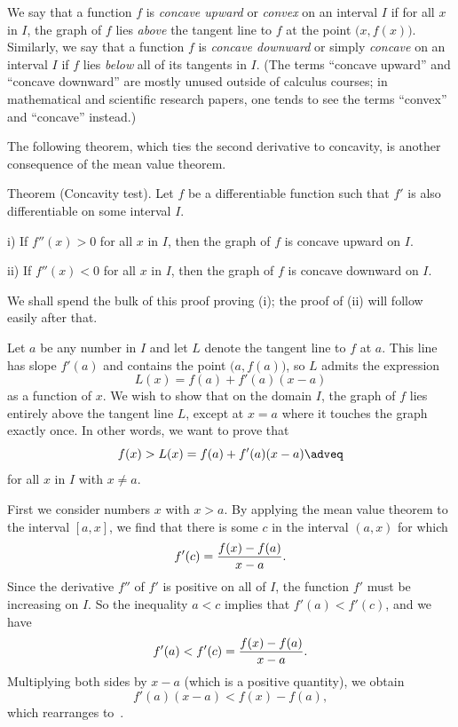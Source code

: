 We say that a function $f$ is {\it concave upward} or {\it convex} on an interval $I$ if for all
$x$ in $I$, the graph of $f$ lies {\it above} the tangent line to $f$ at the point $\bigl( x,f(x)\bigr)$.
Similarly, we say that a function $f$ is {\it concave downward} or simply {\it concave} on an interval $I$
if $f$ lies {\it below} all of its tangents in $I$. (The terms ``concave upward'' and ``concave downward''
are mostly unused outside of calculus courses; in mathematical and scientific research papers, one
tends to see the terms ``convex'' and ``concave'' instead.)

The following theorem, which ties the second derivative to concavity, is another consequence of the
mean value theorem.

\edef\thmconcavity{\the\thmcount}
\parenproclaim Theorem {\advthm} (Concavity test).
Let $f$ be a differentiable function such that $f'$ is also differentiable
on some interval $I$.
\medskip
\item{i)} If $f''(x) > 0$ for all $x$ in $I$, then the graph of $f$ is concave upward on $I$.
\smallskip
\item{ii)} If $f''(x) < 0$ for all $x$ in $I$, then the graph of $f$ is concave downward on $I$.
\medskip

\proof We shall spend the bulk of this proof proving (i); the proof of (ii) will follow easily after that.

Let $a$ be any number in $I$ and let $L$ denote the tangent line to $f$ at $a$. This line has slope
$f'(a)$ and contains the point $\bigl(a, f(a)\bigr)$, so $L$ admits the expression
$$L(x) = f(a) + f'(a) (x-a)$$
as a function of $x$. We wish to show that on the domain $I$,
the graph of $f$ lies entirely above the tangent line $L$, except at
$x=a$ where it touches the graph exactly once. In other words,
we want to prove that
\edef\eqwtsconcavity{\the\eqcount}
$$f(x) > L(x) = f(a) + f'(a) (x-a)\adveq$$
for all $x$ in $I$ with $x\ne a$.

First we consider numbers $x$ with $x>a$. By applying the mean value theorem to the interval $[a,x]$,
we find that there is some $c$ in the interval $(a,x)$ for which
$$f'(c) = {f(x) - f(a)\over x-a}.$$
Since the derivative $f''$ of $f'$ is positive on all of $I$, the function $f'$ must be increasing on $I$.
So the inequality $a<c$ implies that $f'(a) < f'(c)$, and we have
$$f'(a) < f'(c) = {f(x) - f(a)\over x-a}.$$
Multiplying both sides by $x-a$ (which is a positive quantity), we obtain
$$ f'(a)(x-a) < f(x) - f(a),$$
which rearranges to~\refeq{\eqwtsconcavity}.

